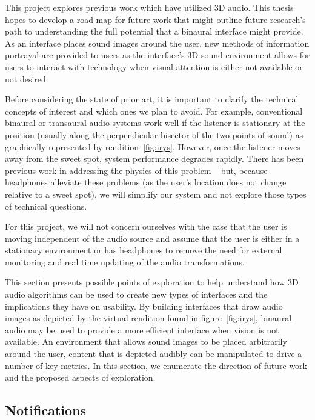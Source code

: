 This project explores previous work which have utilized 3D audio.  This thesis
hopes to develop a road map for future work that might outline future research's
path to understanding the full potential that a binaural interface might
provide.  As an interface places sound images around the user, new methods of
information  portrayal are provided to users as the interface's 3D sound
environment allows for users to interact with technology when visual attention
is either not  available or not desired.

Before considering the state of prior art, it is important to clarify the
technical concepts of interest and which ones we plan to avoid. For example,
conventional binaural or transaural audio systems work well if the listener is
stationary at the position (usually along the perpendicular bisector of the two
points of sound) as  graphically represented by rendition~\ref{fig:irys}.
However, once the listener moves away from the sweet spot, system performance
degrades rapidly. There has been previous work in addressing the physics of this
problem ~\cite{song2010personal} but, because headphones alleviate these
problems (as the user's location does not change relative to a sweet spot), we
will simplify our system and not explore those types of technical questions.

For this project, we will not concern ourselves with the case that the user is
moving independent of the audio source and assume that the user is either in a
stationary environment or has headphones to remove the need for external
monitoring and real time updating of the audio transformations.

This section presents possible points of exploration to help understand how 3D
audio algorithms can be used to create new types of interfaces and the  
implications they have on usability. By building interfaces that draw audio 
images  as depicted by the virtual rendition found in figure~\ref{fig:irys}, 
binaural audio may be used to provide a more efficient interface when vision 
is not available.  An environment that allows sound images to be placed 
arbitrarily around the user, content that is depicted audibly can be manipulated 
to drive a number of key  metrics. In this section, we enumerate the direction 
of future work and the  proposed aspects of exploration.

\subsection{                  Notifications                                  }

